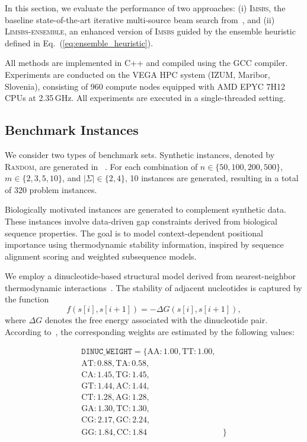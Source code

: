 \documentclass[runningheads]{llncs}
\begin{document}
In this section, we evaluate the performance of two approaches: 
(i) \textsc{Imsbs}, the baseline state-of-the-art iterative multi-source beam search from~\cite{djukanovic2026_eurocast}, and 
(ii) \textsc{Limsbs-ensemble}, an enhanced version of \textsc{Imsbs} guided by the ensemble heuristic defined in Eq.~(\ref{eq:ensemble_heuristic}). 

All methods are implemented in C++ and compiled using the GCC compiler. Experiments are conducted on the VEGA HPC system (IZUM, Maribor, Slovenia), consisting of 960 compute nodes equipped with AMD EPYC 7H12 CPUs at 2.35\,GHz. All experiments are executed in a single-threaded setting.

\medskip
\subsection{Benchmark Instances}

We consider two types of benchmark sets. {Synthetic instances}, denoted by \textsc{Random}, are generated in ~\cite{djukanovic2026_eurocast}. For each combination of $n \in \{50, 100, 200, 500\}$, $m \in \{2, 3, 5, 10\}$, and $|\Sigma| \in \{2, 4\}$, 10 instances are generated, resulting in a total of 320 problem instances.

{Biologically motivated instances} are generated to
 complement synthetic data. These instances involve data-driven gap constraints derived from biological sequence properties. The goal is to model context-dependent positional importance using thermodynamic stability information, inspired by sequence alignment scoring and weighted subsequence models.

We employ a dinucleotide-based structural model derived from nearest-neighbor thermodynamic interactions~\cite{santalucia1998unified,watkins2005nearest}. The stability of adjacent nucleotides is captured by the function
\[
f(s[i], s[i+1]) = -\Delta G(s[i], s[i+1]),
\]
where $\Delta G$ denotes the free energy associated with the dinucleotide pair. According to~\cite{santalucia1998unified}, the corresponding weights are estimated by the following values:

\begin{align*}
\texttt{DINUC\_WEIGHT} = \{
\text{AA}:1.00, \text{TT}:1.00,&\\
\text{AT}:0.88, \text{TA}:0.58,&\\ 
\text{CA}:1.45, \text{TG}:1.45,&\\
\text{GT}:1.44, \text{AC}:1.44,&\\  
\text{CT}:1.28, \text{AG}:1.28,&\\
\text{GA}:1.30, \text{TC}:1.30,&\\  
\text{CG}:2.17, \text{GC}:2.24,&\\
\text{GG}:1.84, \text{CC}:1.84&\}
\end{align*}
\end{document}
